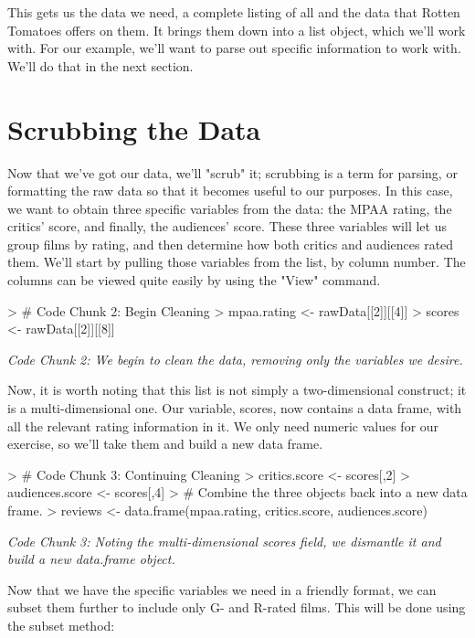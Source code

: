 \documentclass{article}
\begin{document}
This gets us the data we need, a complete listing of all  and the data that Rotten Tomatoes offers on them. It brings them down into a list object, which we'll work with. For our example, we'll want to parse out specific information to work with. We'll do that in the next section.

\section*{Scrubbing the Data}
Now that we've got our data, we'll "scrub" it; scrubbing is a term for parsing, or formatting the raw data so that it becomes useful to our purposes. In this case, we want to obtain three specific variables from the data: the MPAA rating, the critics' score, and finally, the audiences' score. These three variables will let us group films by rating, and then determine how both critics and audiences rated them. We'll start by pulling those variables from the list, by column number. The columns can be viewed quite easily by using the "View" command.

\begin{Schunk}
\begin{Sinput}
> # Code Chunk 2: Begin Cleaning
> mpaa.rating <- rawData[[2]][[4]]
> scores <- rawData[[2]][[8]]           
\end{Sinput}
\end{Schunk}
\emph{Code Chunk 2: We begin to clean the data, removing only the variables we desire.}

Now, it is worth noting that this list is not simply a two-dimensional construct; it is a multi-dimensional one. Our variable, scores, now contains a data frame, with all the relevant rating information in it. We only need numeric values for our exercise, so we'll take them and build a new data frame.

\begin{Schunk}
\begin{Sinput}
> # Code Chunk 3: Continuing Cleaning
> critics.score <- scores[,2]
> audiences.score <- scores[,4]
> # Combine the three objects back into a new data frame.
> reviews <- data.frame(mpaa.rating, critics.score, audiences.score)
\end{Sinput}
\end{Schunk}
\emph{Code Chunk 3: Noting the multi-dimensional scores field, we dismantle it and build a new data.frame object.}

Now that we have the specific variables we need in a friendly format, we can subset them further to include only G- and R-rated films. This will be done using the subset method:
\end{document}

